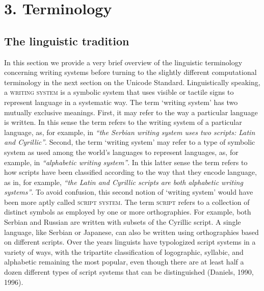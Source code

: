 {{{{{{\section{3. Terminology}\label{terminology}

\subsection{The linguistic tradition}\label{the-linguistic-tradition}

In this section we provide a very brief overview of the linguistic terminology concerning writing systems before turning to the slightly different computational terminology in the next section on the Unicode Standard. Linguistically speaking, a \textsc{writing system} is a symbolic system that uses visible or tactile signs to represent language in a systematic way. The term `writing system' has two mutually exclusive meanings. First, it may refer to the way a particular language is written. In this sense the term refers to the writing system of a particular language, as, for example, in \emph{``the Serbian writing system uses two scripts: Latin and Cyrillic''}. Second, the term `writing system' may refer to a type of symbolic system as used among the world's languages to represent languages, as, for example, in \emph{``alphabetic writing system''}. In this latter sense the term refers to how scripts have been classified according to the way that they encode language, as in, for example, \emph{``the Latin and Cyrillic scripts are both alphabetic writing systems''}. To avoid confusion, this second notion of `writing system' would have been more aptly called \textsc{script system}. The term \textsc{script} refers to a collection of distinct symbols as employed by one or more orthographies. For example, both Serbian and Russian are written with subsets of the Cyrillic script. A single language, like Serbian or Japanese, can also be written using orthographies based on different scripts. Over the years linguists have typologized script systems in a variety of ways, with the tripartite classification of logographic, syllabic, and alphabetic remaining the most popular, even though there are at least half a dozen different types of script systems that can be distinguished (Daniels, 1990, 1996).

}}}}}}

